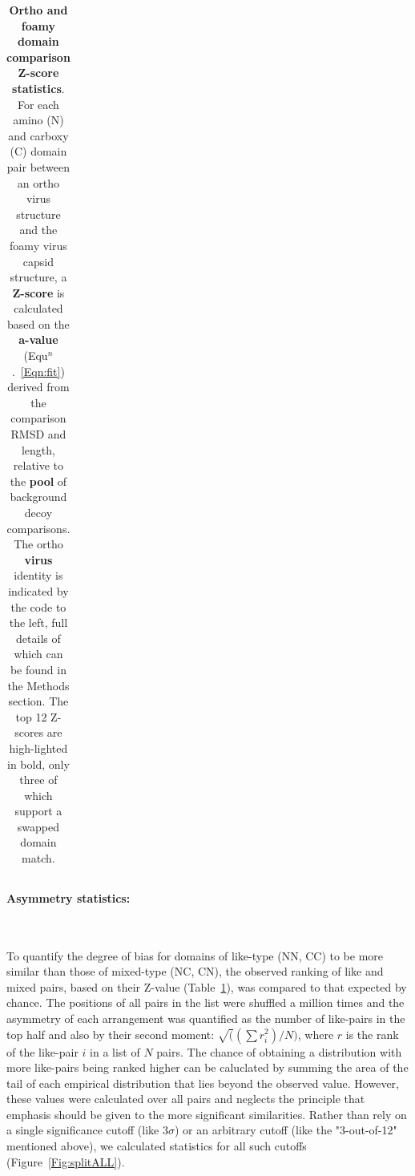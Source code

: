 \documentclass[12pt]{article}
\newcommand{\Eqn}[1]{Equ$^n$.~\ref{Eqn:#1}}
\newcommand{\Tab}[1]{Table~\ref{Tab:#1}}
\newcommand{\Fig}[1]{Figure~\ref{Fig:#1}}
\newcommand{\3}{$3_{10}$}
\begin{document}
\begin{table}
\begin{tabular}{r|lll|lll|}
\end{tabular}
\begin{footnotesize}
\caption{
\label{Tab:Zscores}
{\bf Ortho and foamy domain comparison Z-score statistics}.
For each amino (N) and carboxy (C) domain pair between an ortho virus structure and the foamy virus capsid structure,
a {\bf Z-score} is calculated based on the {\bf a-value} (\Eqn{fit}) derived from the comparison RMSD and length,
relative to the {\bf pool} of background decoy comparisons.   The ortho {\bf virus} identity is indicated by the 
code to the left, full details of which can be found in the Methods section.
The top 12 Z-scores are high-lighted in bold, only three of which support a swapped domain match.
}
\end{footnotesize}
\end{table}

\paragraph{Asymmetry statistics:}\

To quantify the degree of bias for domains of like-type (NN, CC) to be more similar than those of mixed-type (NC, CN),
the observed ranking of like and mixed pairs, based on their Z-value (\Tab{Zscores}), was compared to that expected by
chance.  The positions of all pairs in the list were shuffled a million times and the asymmetry of each arrangement was
quantified as the number of like-pairs in the top half and also by their second moment: $\surd((\sum r^2_i)/N)$, where $r$
is the rank of the like-pair $i$ in a list of $N$ pairs.  The chance of obtaining a distribution with more like-pairs
being ranked higher can be caluclated by summing the area of the tail of each empirical distribution that lies beyond the
observed value.   However, these values were calculated over all pairs and neglects the principle that emphasis should
be given to the more significant similarities.  Rather than rely on a single significance cutoff (like 3$\sigma$) or an
arbitrary cutoff (like the "3-out-of-12" mentioned above), we calculated statistics for all such cutoffs (\Fig{splitALL}).
\end{document}
